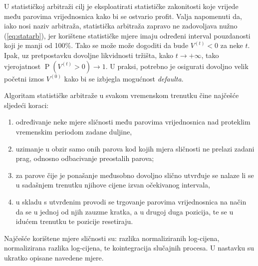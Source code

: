 \documentclass[lmodern, utf8, diplomski, numeric]{fer}
\newcommand{\prob}[1]{\operatorname{P}\q(#1\w)}
\newcommand{\q}{\left}
\newcommand{\w}{\right}
\begin{document}
  U statističkoj arbitraži cilj je eksploatirati statističke zakonitosti koje vrijede među parovima vrijednosnica kako bi se ostvario profit.  
  Valja napomenuti da, iako nosi naziv arbitraža, statistička arbitraža zapravo ne zadovoljava nužno (\ref{eq:statarb}), jer korištene statističke mjere imaju određeni interval pouzdanosti koji je manji od 100\%.
  Tako se može može dogoditi da bude $V^{\q(t\w)} < 0$ za neke $t$.
  Ipak, uz pretpostavku dovoljne likvidnosti tržišta, kako $t \to +\infty$, tako vjerojatnost $\prob{V^{\q(t\w)} > 0} \to 1$.
  U praksi, potrebno je osigurati dovoljno velik početni iznos $V^{(0)}$ kako bi se izbjegla mogućnost \textit{defaulta}.
  
  Algoritam statističke arbitraže u svakom vremenskom trenutku čine najčešće sljedeći koraci:
  \begin{enumerate}
    \item određivanje neke mjere sličnosti među parovima vrijednosnica nad proteklim vremenskim periodom zadane duljine,
    \item uzimanje u obzir samo onih parova kod kojih mjera sličnosti ne prelazi zadani prag, odnosno odbacivanje preostalih parova;
    \item za parove čije je ponašanje međusobno dovoljno slično utvrđuje se nalaze li se u sadašnjem trenutku njihove cijene izvan očekivanog intervala,
    \item u skladu s utvrđenim provodi se trgovanje parovima vrijednosnica na način da se u jednoj od njih zauzme kratka, a u drugoj duga pozicija, te se u idućem trenutku te pozicije resetiraju.
  \end{enumerate}
  
  Najčešće korištene mjere sličnosti su: razlika normaliziranih log-cijena, normalizirana razlika log-cijena, te kointegracija slučajnih procesa.
  U nastavku su ukratko opisane navedene mjere.
  
\end{document}
